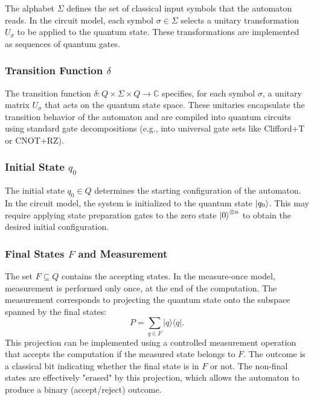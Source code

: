 The alphabet $\Sigma$ defines the set of classical input symbols that the automaton reads. In the circuit model, each symbol $\sigma \in \Sigma$ selects a unitary transformation $U_\sigma$ to be applied to the quantum state. These transformations are implemented as sequences of quantum gates.

\subsubsection{Transition Function $\delta$}

The transition function $\delta: Q \times \Sigma \times Q \to \mathbb{C}$ specifies, for each symbol $\sigma$, a unitary matrix $U_\sigma$ that acts on the quantum state space. These unitaries encapsulate the transition behavior of the automaton and are compiled into quantum circuits using standard gate decompositions (e.g., into universal gate sets like Clifford+T or CNOT+RZ).

\subsubsection{Initial State $q_0$}

The initial state $q_0 \in Q$ determines the starting configuration of the automaton. In the circuit model, the system is initialized to the quantum state $\ket{q_0}$. This may require applying state preparation gates to the zero state $\ket{0}^{\otimes n}$ to obtain the desired initial configuration.

\subsubsection{Final States $F$ and Measurement}

The set $F \subseteq Q$ contains the accepting states. In the measure-once model, measurement is performed only once, at the end of the computation. The measurement corresponds to projecting the quantum state onto the subspace spanned by the final states:
\[
P=\sum_{q\in F} |q\rangle\langle q|.
\]
This projection can be implemented using a controlled measurement operation that accepts the computation if the measured state belongs to $F$. The outcome is a classical bit indicating whether the final state is in $F$ or not. The non-final states are effectively "erased" by this projection, which allows the automaton to produce a binary (accept/reject) outcome.

\medskip

